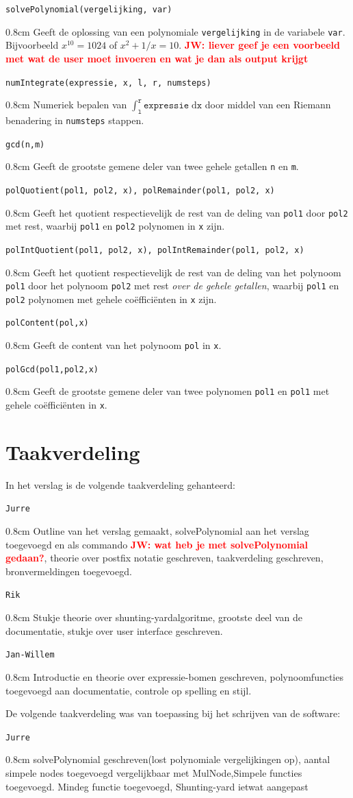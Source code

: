\documentclass[a4paper]{article}
\newcommand{\rcom}[1]{\textbf{\textcolor{red}{#1}}}
\newcommand{\com}[2]{\texttt{#1}\mbox{}\vspace{-2ex}\begin{adjustwidth}{0.8cm}{} #2 \end{adjustwidth}}
\newcommand{\ttt}[1]{\texttt{#1}}
\begin{document}
\com{solvePolynomial(vergelijking, var)}{Geeft de oplossing van een polynomiale \ttt{vergelijking} in de variabele \ttt{var}. Bijvoorbeeld $x^{10} = 1024$ of $x^2 + 1/x = 10$. \rcom{JW: liever geef je een voorbeeld met wat de user moet invoeren en wat je dan als output krijgt} }
\com{numIntegrate(expressie, x, l, r, numsteps)}{Numeriek bepalen van $\int_{\texttt{l}}^\texttt{r} \texttt{expressie} \; \mathrm{d}\texttt{x}$ door middel van een Riemann benadering in \texttt{numsteps} stappen.}
\com{gcd(n,m)}{Geeft de grootste gemene deler van twee gehele getallen \texttt{n} en \texttt{m}.}
\com{polQuotient(pol1, pol2, x), polRemainder(pol1, pol2, x)}{Geeft het quotient respectievelijk de rest van de deling van \texttt{pol1} door \texttt{pol2} met rest, waarbij \texttt{pol1} en \texttt{pol2} polynomen in \texttt{x} zijn.}
\com{polIntQuotient(pol1, pol2, x), polIntRemainder(pol1, pol2, x)}{Geeft het quotient respectievelijk de rest van de deling van het polynoom \texttt{pol1} door het polynoom \texttt{pol2} met rest \textit{over de gehele getallen}, waarbij \texttt{pol1} en \texttt{pol2} polynomen met gehele co\"effici\"enten in \texttt{x} zijn.}
\com{polContent(pol,x)}{Geeft de content van het polynoom \texttt{pol} in \texttt{x}.}
\com{polGcd(pol1,pol2,x)}{Geeft de grootste gemene deler van twee polynomen \texttt{pol1} en \texttt{pol1} met gehele co\"effici\"enten in \texttt{x}.}


\section{Taakverdeling}
In het verslag is de volgende taakverdeling gehanteerd:

\com{Jurre} {Outline van het verslag gemaakt, solvePolynomial aan het verslag toegevoegd en als commando \rcom{JW: wat heb je met solvePolynomial gedaan?}, theorie over postfix notatie geschreven, taakverdeling geschreven, bronvermeldingen toegevoegd.}

\com{Rik} {Stukje theorie over shunting-yardalgoritme, grootste deel van de documentatie, stukje over user interface geschreven.}
\com{Jan-Willem} {Introductie en theorie over expressie-bomen geschreven, polynoomfuncties toegevoegd aan documentatie, controle op spelling en stijl.}

De volgende taakverdeling was van toepassing bij het schrijven van de software:

\com{Jurre} {solvePolynomial geschreven(lost polynomiale vergelijkingen op), aantal simpele nodes toegevoegd vergelijkbaar met MulNode,Simpele functies toegevoegd. Mindeg functie toegevoegd, Shunting-yard ietwat aangepast}
\end{document}

